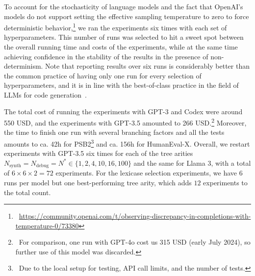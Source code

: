 To account for the stochasticity of language models and the fact that OpenAI's models do not support setting the effective sampling temperature to zero to force deterministic behavior,\footnote{~\url{https://community.openai.com/t/observing-discrepancy-in-completions-with-temperature-0/73380}} we ran the experiments six times with each set of hyperparameters.
This number of runs was selected to hit a sweet spot between the overall running time and costs of the experiments, while at the same time achieving confidence in the stability of the results in the presence of non-determinism. 
Note that reporting results over six runs is considerably better than the common practice of having only one run for every selection of hyperparameters, and it is in line with the best-of-class practice in the field of LLMs for code generation~\cite{ouyang2023:llm}.

The total cost of running the experiments with GPT-3 and Codex were around 550 USD, and the experiments with GPT-3.5 amounted to 266 USD.\footnote{~For comparison, one run with GPT-4o cost us 315 USD (early July 2024), so further use of this model was discarded.}
Moreover, the time to finish one run with several branching factors and all the tests amounts to ca. 42h for PSB2\footnote{~Due to the local setup for testing, API call limits, and the number of tests.} and ca. 156h for HumanEval-X.
Overall, we restart experiments with GPT-3.5 six times for each of the tree arities $ N_{\text{synth}} = N_{\text{debug}} = N^* \in \{1,2, 4,10,16,100\}$ and the same for Llama 3, with a total of $6 \times 6 \times 2 = 72$ experiments. 
For the lexicase selection experiments, we have 6 runs per model but one best-performing tree arity, which adds $12$ experiments to the total count.

